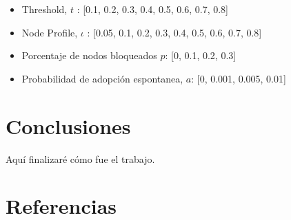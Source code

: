 \documentclass{article}
\begin{document}
\begin{itemize}
\item Threshold, $t$ : [0.1, 0.2, 0.3, 0.4, 0.5, 0.6, 0.7, 0.8]
\item Node Profile, $\iota$ : [0.05, 0.1, 0.2, 0.3, 0.4, 0.5, 0.6, 0.7, 0.8]
\item Porcentaje de nodos bloqueados $p$: [0, 0.1, 0.2, 0.3]
\item Probabilidad de adopción espontanea, $a$: [0, 0.001, 0.005, 0.01]
\end{itemize}


\section{Conclusiones}
	Aquí finalizaré cómo fue el trabajo.
	
\section{Referencias}

\printbibliography
\end{document}
